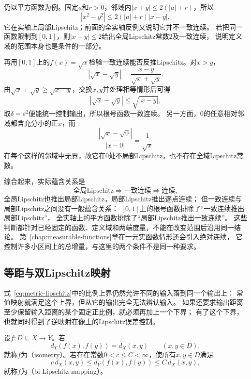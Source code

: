 仍以平方函数为例。固定$a$和$r>0$，邻域内$|x+y|\leq2(|a|+r)$，所以
\[
  |x^2-y^2|\leq 2(|a|+r)|x-y|,
\]
它在实轴上局部Lipschitz；前面的全实轴反例又说明它并不一致连续。
若把同一函数限制到$[0,1]$，则$|x+y|\leq2$给出全局Lipschitz常数$2$及一致连续，
说明定义域的范围本身也是条件的一部分。

再用$[0,1]$上的$f(x)=\sqrt x$检验一致连续能否反推Lipschitz。对$x>y$，
\[
  |\sqrt x-\sqrt y|=\frac{x-y}{\sqrt x+\sqrt y}.
\]
由$\sqrt x+\sqrt y\geq\sqrt{x-y}$，交换$x,y$并处理相等情形后可得
\[
  |\sqrt x-\sqrt y|\leq\sqrt{|x-y|},
\]
取$\delta=\varepsilon^2$便能统一控制输出，所以根号函数一致连续。
另一方面，$0$的任意相对邻域都含充分小的正$x$，而
\[
  \frac{|\sqrt x-\sqrt0|}{|x-0|}=\frac1{\sqrt x}
\]
在每个这样的邻域中无界，故它在$0$处不局部Lipschitz，也不存在全域Lipschitz常数。

综合起来，实际蕴含关系是
\[
  \text{全局Lipschitz}\Longrightarrow\text{一致连续}\Longrightarrow\text{连续},
\]
全局Lipschitz也推出局部Lipschitz，局部Lipschitz推出逐点连续；
但一致连续与局部Lipschitz之间没有一般蕴含关系：
$[0,1]$上的根号函数排除了“一致连续推出局部Lipschitz”，
全实轴上的平方函数排除了“局部Lipschitz推出一致连续”。
这些判断都针对已经固定的函数、定义域和两端度量，不能在改变范围后沿用同一结论。
第~\ref{chap:measurable-functions}章在一元实函数情形还会引入绝对连续，
它控制许多小区间上的总增量，与这里的两个条件不是同一种要求。

\subsection{等距与双Lipschitz映射}
\label{sec:metric-isometry-bilipschitz}

式~\eqref{eq:metric-lipschitz}中的比例上界仍然允许不同的输入落到同一个输出上：
常值映射就满足这个上界，但从它的输出完全无法辨认输入。
如果还要求输出距离至少保留输入距离的某个固定正比例，就必须再加上一个下界；
有了这个下界，也就同时得到了逆映射在像上的Lipschitz误差控制。

\begin{definition}[等距映射与双Lipschitz映射]
\label{def:metric-isometry-bilipschitz}
设$f:D\subseteq X\to Y$。若
\[
  d_Y(f(x),f(y))=d_X(x,y)\qquad(x,y\in D),
\]
就称$f$为（isometry）。若存在常数$0<c\leq C<\infty$，使所有$x,y\in D$满足
\begin{equation}
\label{eq:metric-bilipschitz}
  c\,d_X(x,y)\leq d_Y(f(x),f(y))\leq C\,d_X(x,y),
\end{equation}
就称$f$为（bi-Lipschitz mapping）。
\end{definition}

